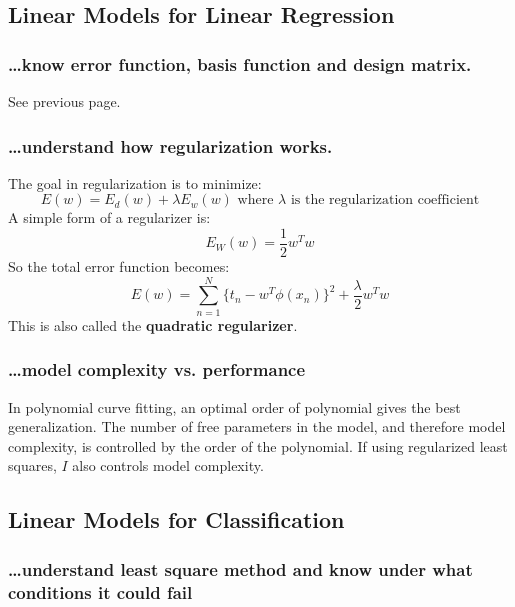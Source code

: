 \documentclass[11pt]{article} %
\begin{document}
\subsection{Linear Models for Linear Regression}

\subsubsection{\ldots know error function, basis function and design matrix.}

See previous page.

\subsubsection{\ldots understand how regularization works.}

The goal in regularization is to minimize:
\begin{equation}
E(w) = E_d(w) + \lambda E_w(w) \text{ where } \lambda \text{ is the regularization coefficient}
\end{equation}
A simple form of a regularizer is:
\begin{equation}
E_W(w) = \frac{1}{2}w^Tw
\end{equation}
So the total error function becomes:
\begin{equation}
E(w) = \sum_{n=1}^{N} \Big\{ t_n - w^T\phi(x_n) \Big\}^2 + \frac{\lambda}{2}w^Tw
\end{equation}
This is also called the {\bf quadratic regularizer}. 

\subsubsection{\ldots model complexity vs. performance}

In polynomial curve fitting, an optimal order of polynomial gives the best generalization. The number of free parameters in the model, and therefore model complexity, is controlled by the order of the polynomial. If using regularized least squares, $I$ also controls model complexity.

\subsection{Linear Models for Classification}

\subsubsection{\ldots understand least square method and know under what conditions it could fail}
\end{document}
